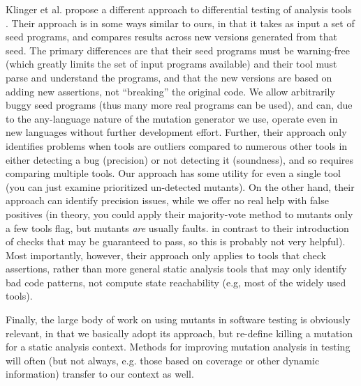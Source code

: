 Klinger et al. propose a different approach to differential testing of analysis tools \cite{klinger2019differentially}.  Their approach is in some ways similar to ours, in that it takes as input a set of seed programs, and compares results across new versions generated from that seed.  The primary differences are that their seed programs must be warning-free (which greatly limits the set of input programs available) and their tool must parse and understand the programs, and that the new versions are based on adding new assertions, not ``breaking'' the original code.  We allow arbitrarily buggy seed programs (thus many more real programs can be used), and can, due to the any-language nature of the mutation generator we use, operate even in new languages without further development effort.  Further, their approach only identifies problems when tools are outliers compared to numerous other tools in either detecting a bug (precision) or not detecting it (soundness), and so requires comparing multiple tools.  Our approach has some utility for even a single tool (you can just examine prioritized un-detected mutants).  On the other hand, their approach can identify precision issues, while we offer no real help with false positives (in theory, you could apply their majority-vote method to mutants only a few tools flag, but mutants \emph{are} usually faults. in contrast to their introduction of checks that may be guaranteed to pass, so this is probably not very helpful).  Most importantly, however, their approach only applies to tools that check assertions, rather than more general static analysis tools that may only identify bad code patterns, not compute state reachability (e.g, most of the widely used tools).

Finally, the large body of work on using mutants in software testing \cite{jia2011analysis,demillo1978hints,budd1980theoretical, groce2015verified,groce2018verified,MutGoogle,ivankovic2018industrial,mutKernel} is obviously relevant, in that we basically adopt its approach, but re-define killing a mutation for a static analysis context.  Methods for improving mutation analysis in testing will often (but not always, e.g. those based on coverage or other dynamic information) transfer to our context as well.